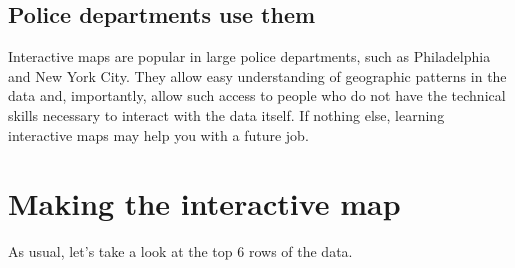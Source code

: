 \documentclass[
  a4paper,
]{krantz}
\begin{document}
\hypertarget{police-departments-use-them}{%
\subsection{Police departments use
them}\label{police-departments-use-them}}

Interactive maps are popular in large police departments,
such as Philadelphia and New York City. They allow easy
understanding of geographic patterns in the data and,
importantly, allow such access to people who do not have the
technical skills necessary to interact with the data itself.
If nothing else, learning interactive maps may help you with
a future job.

\hypertarget{making-the-interactive-map}{%
\section{Making the interactive
map}\label{making-the-interactive-map}}

As usual, let's take a look at the top 6 rows of the data.
\end{document}
